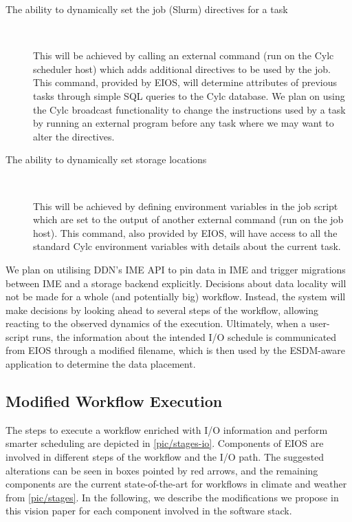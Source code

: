 \documentclass{superfri}
\begin{document}
\begin{description}

\item[The ability to dynamically set the job (Slurm) directives for a task]

\ \\ \vspace{-0.6cm}

This will be achieved by calling an external command (run on the Cylc scheduler host) which adds additional directives to be used by the job.
This command, provided by EIOS, will determine attributes of previous tasks through simple SQL queries to the Cylc database.
We plan on using the Cylc broadcast functionality to change the instructions used by a task by running an external program before any task where we may want to alter the directives.

\item[The ability to dynamically set storage locations]

\ \\ \vspace{-0.6cm}

This will be achieved by defining environment variables in the job script which are set to the output of another external command (run on the job host).
This command, also provided by EIOS, will have access to all the standard Cylc environment variables with details about the current task. \vspace{-0.1cm}

\end{description}

We plan on utilising DDN's IME API to pin data in IME and trigger migrations between IME and a storage backend explicitly.
Decisions about data locality will not be made for a whole (and potentially big) workflow.
Instead, the system will make decisions by looking ahead to several steps of the workflow, allowing reacting to the observed dynamics of the execution.
Ultimately, when a user-script runs, the information about the intended I/O schedule is communicated from EIOS through a modified filename, which is then used by the ESDM-aware application to determine the data placement.

\subsection{Modified Workflow Execution}

The steps to execute a workflow enriched with I/O information and perform smarter scheduling are depicted in \cref{pic/stages-io}.
Components of EIOS are involved in different steps of the workflow and the I/O path.
The suggested alterations can be seen in boxes pointed by red arrows, and the remaining components are the current state-of-the-art for workflows in climate and weather from \cref{pic/stages}.
In the following, we describe the modifications we propose in this vision paper for each component involved in the software stack.
\end{document}
